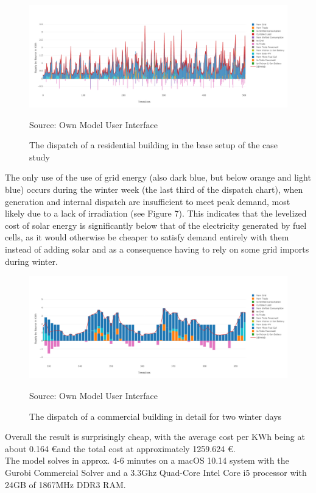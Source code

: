 \documentclass[
	11pt,								%
	DIV10,								%
	a4paper,         					%
	oneside,							%
	headheight=20pt,					%
	footheight=20pt,					%
    parskip=full,						%
    listof=totoc,						%
	bibliography=totoc,					%
	index=totoc,						%
]{scrartcl}
\begin{document}
\begin{figure}[H]
	\centering
	\includegraphics[width=1\textwidth]{pictures/RES_1_Base.png}
	\caption{The dispatch of a residential building in the base setup of the case study}
	\label{residential_dispatch_base}
	\flushleft\quad\quad\footnotesize{Source: Own Model User Interface}
\end{figure}	

The only use of the use of grid energy (also dark blue, but below orange and light blue) occurs during the winter week (the last third of the dispatch chart), when generation and internal dispatch are insufficient to meet peak demand, most likely due to a lack of irradiation (see Figure 7). This indicates that the levelized cost of solar energy is significantly below that of the electricity generated by fuel cells, as it would otherwise be cheaper to satisfy demand entirely with them instead of adding solar and as a consequence having to rely on some grid imports during winter.

\begin{figure}[H]
	\centering
	\includegraphics[width=1\textwidth]{pictures/COM_2_ZOOM_Base.png}
	\caption{The dispatch of a commercial building in detail for two winter days}
	\label{commercial_dispatch_base}
	\flushleft\quad\quad\footnotesize{Source: Own Model User Interface}
\end{figure}	

Overall the result is surprisingly cheap, with the average cost per KWh being at about 0.164 \euro and the total cost at approximately 1259.624 \euro.\\
The model solves in approx. 4-6 minutes on a macOS 10.14 system with the Gurobi Commercial Solver and a 3.3Ghz Quad-Core Intel Core i5 processor with 24GB of 1867MHz DDR3 RAM.
\end{document}
